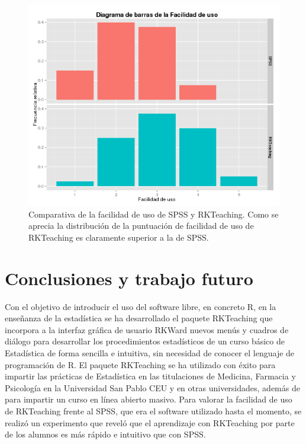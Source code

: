 \documentclass[10pt,twoside,spanish]{article}
\numberwithin{equation}{section}
\begin{document}
\begin{figure}[htp]
\begin{center}
  \includegraphics[width=\textwidth]{img/diagrama_barras_facilidad_uso.png}
  \caption{Comparativa de la facilidad de uso de SPSS y RKTeaching. Como se
  aprecia la distribución de la puntuación de facilidad de uso de RKTeaching es claramente superior a la de SPSS.}
  \label{g:facilidad_uso}
\end{center}
\end{figure}

\section{Conclusiones y trabajo futuro}
Con el objetivo de introducir el uso del software libre, en concreto R, en la enseñanza de la estadística se ha desarrollado el paquete
RKTeaching que incorpora a la interfaz gráfica de usuario RKWard nuevos menús y cuadros de diálogo para desarrollar los procedimientos
estadísticos de un curso básico de Estadística de forma sencilla e intuitiva, sin necesidad de conocer el lenguaje de programación de R.
El paquete RKTeaching se ha utilizado con éxito para impartir las prácticas de Estadística en las titulaciones de Medicina, Farmacia y
Psicología en la Universidad San Pablo CEU y en otras universidades, además de para impartir un curso en línea abierto masivo.
Para valorar la facilidad de uso de RKTeaching frente al SPSS, que era el software utilizado hasta el momento, se realizó un
experimento que reveló que el aprendizaje con RKTeaching por parte de los alumnos es más rápido e intuitivo que con SPSS.
\end{document}
